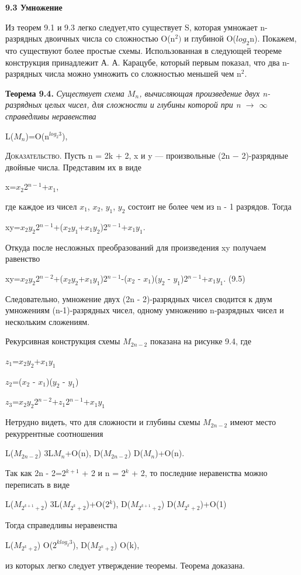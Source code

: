 \documentclass[a4paper,12pt]{book}[2018/09/03]
\begin{document}
\textbf{9.3 Умножение}

Из теорем 9.1 и 9.3 легко следует,что существует S, которая умножает n-разрядных двоичных числа со сложностью O(n$^{2})$ и глубиной O($log_{2}$n). Покажем, что существуют более простые схемы. Использованная в следующей теореме конструкция принадлежит А. А. Карацубе, который первым показал, что два n-разрядных числа можно умножить со сложностью меньшей чем n$^{2}$.
\parskip=3mm

\textbf{Теорема 9.4.}
\textit{Существует схема $M_{n}$, вычисляющая произведение двух n-разрядных целых чисел, для сложности и глубины которой при n $\to $ $\infty $ справедливы неравенства}
\begin{center}
L($M_{n}$)=O(n$^{log_{2}3}$), 
\end{center}
\textsc{Доказательство.}
Пусть n = 2k + 2, x и y — произвольные (2n − 2)-разрядные двойные числа. Представим их в виде
\begin{center}
x=$x_{2}$2$^{n-1}$+$x_{1}$, 
\end{center}
где каждое из чисел $x_{1}$, $x_{2}$, $y_{1}$, $y_{2}$ состоит не более чем из n - 1 разрядов.
Тогда
\begin{center}
xy=$x_{2}$$y_{2}$2$^{n-1}$+($x_{2}$$y_{1}$+$x_{1}$$y_{2}$)2$^{n-1}$+$x_{1}$$y_{1}$.
\end{center}
Откуда после несложных преобразований для произведения xy получаем равенство
\begin{center}
xy=$x_{2}$$y_{2}$2$^{n-2}$+($x_{2}$$y_{2}$+$x_{1}$$y_{1}$)2$^{n-1}$-($x_{2}$ - $x_{1}$)($y_{2}$ - $y_{1}$)2$^{n-1}$+$x_{1}$$y_{1}$. (9.5)
\end{center}
Следовательно, умножение двух (2n - 2)-разрядных чисел сводится к двум умножениям (n-1)-разрядных чисел, одному умножению n-разрядных чисел и нескольким сложениям.

Рекурсивная конструкция схемы $M_{2n-2}$ показана на рисунке 9.4, где
\begin{flushleft}
$z_{1}$=$x_{2}$$y_{2}$+$x_{1}$$y_{1}$

$z_{2}$=($x_{2}$ - $x_{1}$)($y_{2}$ - $y_{1}$)

$z_{3}$=$x_{2}$$y_{2}$2$^{n-2}$+$z_{1}$2$^{n-1}$+$x_{1}$$y_{1}$
\end{flushleft}
Нетрудно видеть, что для сложности и глубины схемы $M_{2n-2}$ имеют место рекуррентные соотношения
\begin{center}
L($M_{2n-2}$) \le 3L$M_{n}$+O(n), \quad D($M_{2n-2}$) \le D($M_{n}$)+O(n).
\end{center}
Так как 2n - 2=2$^{k+1}$ + 2 и n = 2$^{k}$ + 2, то последние неравенства можно переписать в виде
\begin{center}
L($M_{2^{k+1}+{2}}$) \le 3L($M_{2^{k}+{2}}$)+O(2$^{k}$), \quad D($M_{2^{k+1}+{2}}$) \le  D($M_{2^{k}+{2}}$)+O(1)
\end{center}
Тогда справедливы неравенства
\begin{center}
L($M_{2^{k}+{2}}$) \le  O($2^{klog_{2}3}$), \quad D($M_{2^{k}+{2}}$) \le O(k),
\end{center}
из которых легко следует утверждение теоремы. Теорема доказана.
\end{document}
